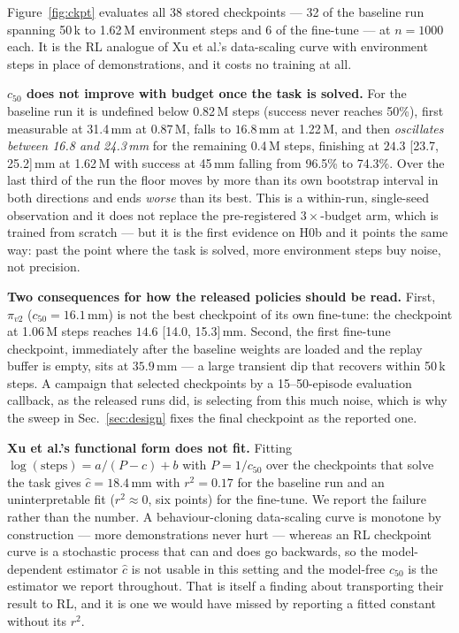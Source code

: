 \documentclass{article}
\begin{document}
Figure~\ref{fig:ckpt} evaluates all 38 stored checkpoints --- 32 of the baseline
run spanning 50\,k to 1.62\,M environment steps and 6 of the fine-tune --- at
$n{=}1000$ each. It is the RL analogue of Xu et al.'s data-scaling curve with
environment steps in place of demonstrations, and it costs no training at all.

\textbf{$c_{50}$ does not improve with budget once the task is solved.} For the
baseline run it is undefined below 0.82\,M steps (success never reaches 50\%),
first measurable at 31.4\,mm at 0.87\,M, falls to $16.8$\,mm at 1.22\,M, and
then \emph{oscillates between 16.8 and 24.3\,mm} for the remaining 0.4\,M steps,
finishing at $24.3$ [23.7, 25.2]\,mm at 1.62\,M with success at 45\,mm falling
from 96.5\% to 74.3\%. Over the last third of the run the floor moves by more
than its own bootstrap interval in both directions and ends \emph{worse} than
its best. This is a within-run, single-seed observation and it does not replace
the pre-registered $3\times$-budget arm, which is trained from scratch --- but
it is the first evidence on H0b and it points the same way: past the point where
the task is solved, more environment steps buy noise, not precision.

\textbf{Two consequences for how the released policies should be read.} First,
$\pi_{v2}$ ($c_{50}{=}16.1$\,mm) is not the best checkpoint of its own
fine-tune: the checkpoint at 1.06\,M steps reaches $14.6$ [14.0, 15.3]\,mm.
Second, the first fine-tune checkpoint, immediately after the baseline weights
are loaded and the replay buffer is empty, sits at $35.9$\,mm --- a large
transient dip that recovers within 50\,k steps. A campaign that selected
checkpoints by a 15--50-episode evaluation callback, as the released runs did,
is selecting from this much noise, which is why the sweep in
Sec.~\ref{sec:design} fixes the final checkpoint as the reported one.

\textbf{Xu et al.'s functional form does not fit.} Fitting
$\log(\text{steps}) = a/(P - c) + b$ with $P = 1/c_{50}$ over the checkpoints
that solve the task gives $\hat c = 18.4$\,mm with $r^2 = 0.17$ for the baseline
run and an uninterpretable fit ($r^2 \approx 0$, six points) for the fine-tune.
We report the failure rather than the number. A behaviour-cloning data-scaling
curve is monotone by construction --- more demonstrations never hurt --- whereas
an RL checkpoint curve is a stochastic process that can and does go backwards,
so the model-dependent estimator $\hat c$ is not usable in this setting and the
model-free $c_{50}$ is the estimator we report throughout. That is itself a
finding about transporting their result to RL, and it is one we would have
missed by reporting a fitted constant without its $r^2$.
\end{document}
